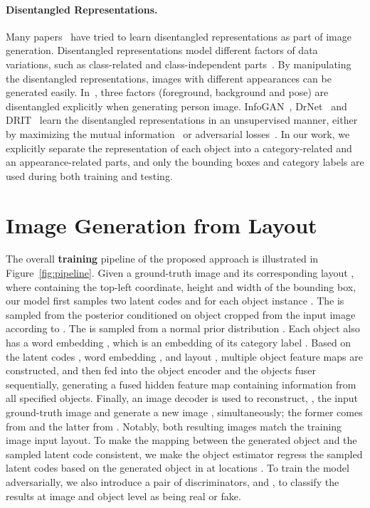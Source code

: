 \documentclass[10pt,twocolumn,letterpaper]{article}
\begin{document}
\vspace{-0.15in}
\paragraph{Disentangled Representations.}
Many papers~\cite{chen2016infogan,Cheung2015,Denton2017,Lai2017,lee2018diverse,Ma2018,Mathieu2016,Murez2018} have tried to learn disentangled representations as part of image generation. Disentangled representations model different factors of data variations, such as class-related and class-independent parts~\cite{Cheung2015,Lai2017,lee2018diverse,Mathieu2016,Murez2018}. By manipulating the disentangled representations, images with different appearances can be generated easily.
In~\cite{Ma2018}, three factors (foreground, background and pose) are disentangled explicitly when generating person image. 
InfoGAN~\cite{chen2016infogan}, DrNet~\cite{Denton2017} and DRIT~\cite{lee2018diverse} learn the disentangled representations in an unsupervised manner, either by maximizing the mutual information~\cite{chen2016infogan} 
or adversarial losses~\cite{Denton2017, lee2018diverse}. 
In our work, we explicitly separate the representation of each object into a category-related and an appearance-related parts, and only the bounding boxes and category labels are used during both training and testing.



\section{Image Generation from Layout}
\label{sec:method}



The overall {\bf training} pipeline of the proposed approach is illustrated in Figure~\ref{fig:pipeline}.
Given a ground-truth image  and its corresponding layout , where  containing the top-left  coordinate, height and width of the bounding box, our model first samples two latent codes  and  for each object instance . 
The  is sampled from the posterior  conditioned on
object  cropped from the input image according to . The  is sampled from a normal prior distribution .
Each object  also has a word embedding , which is an embedding of its category label .
Based on the latent codes , word embedding , and layout , multiple object feature maps  are constructed, and then fed into the object encoder and the objects fuser sequentially, generating a fused hidden feature map  containing information from all specified objects.
Finally, an image decoder  is used to reconstruct, , the input ground-truth image  and generate a new image , simultaneously; the former comes from  and the latter from . Notably, both resulting images match the training image input layout.
To make the mapping between the generated object  and the sampled latent code  consistent, we make the object estimator regress the sampled latent codes  based on the generated object  in  at locations .
To train the model adversarially, we also introduce a pair of discriminators,  and , to classify the results at image and object level as being real or fake.
\end{document}
